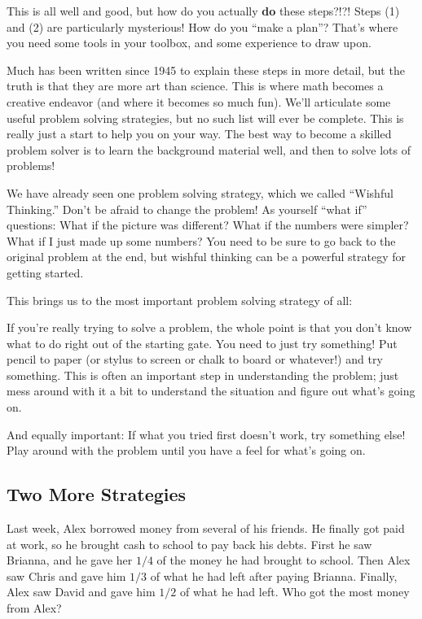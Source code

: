 This is all well and good, but how do you actually {\bf do} these steps?!?!  Steps (1) and (2) are particularly mysterious!  How do you ``make a plan''?  That's where you need some tools in your toolbox, and some experience to draw upon.  

Much has been written since 1945 to explain these steps in more detail, but the truth is that they are more art than science.  This is where math becomes a creative endeavor (and where it becomes so much fun).  We'll articulate some useful problem solving strategies, but no such list will ever be complete.  This is really just a start to help you on your way.  The best way to become a skilled problem solver is to learn the background material well, and then to solve lots of problems!

We have already seen one problem solving strategy, which we called ``Wishful Thinking.''  Don't be afraid to change the problem!  As yourself ``what if'' questions: What if the picture was different?  What if the numbers were simpler?  What if I just made up some numbers?  You need to be sure to go back to the original problem at the end, but wishful thinking can be a powerful strategy for getting started.

This brings us to the most important problem solving strategy of all:
\begin{ps}
If you're really trying to solve a problem, the whole point is that you don't know what to do right out of the starting gate.  You need to just try something!  Put pencil to paper (or stylus to screen or chalk to board or whatever!) and try something.  This is often an important step in understanding the problem; just mess around with it a bit to understand the situation and figure out what's going on.
\end{ps}

And equally important: If what you tried first doesn't work, try something else!  Play around with the problem until you have a feel for what's going on.



\subsection{Two More Strategies}
\begin{problem}[Payback]
Last week, Alex borrowed money from several of his friends.  He finally got paid at work, so he brought cash to school to pay back his debts.  First he saw Brianna, and he gave her $1/4$ of the money he had brought to school.  Then Alex saw Chris and gave him $1/3$ of what he had left after paying Brianna.  Finally, Alex saw David and gave him $1/2$ of what he had left.  Who got the most money from Alex?
\end{problem}


